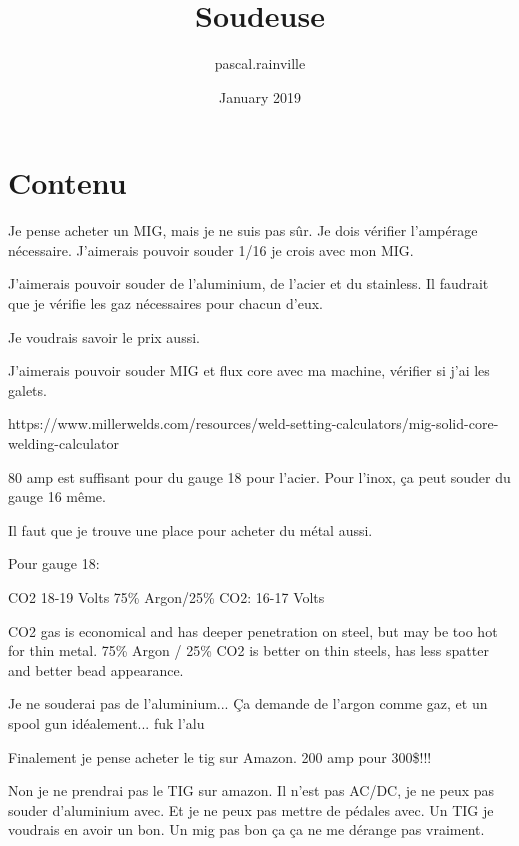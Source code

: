 \documentclass{article}
\title{Soudeuse}
\author{pascal.rainville }
\date{January 2019}
\begin{document}
\maketitle

\section{Contenu}

Je pense acheter un MIG, mais je ne suis pas sûr. Je dois vérifier l'ampérage nécessaire. J'aimerais pouvoir souder 1/16 je crois avec mon MIG.

J'aimerais pouvoir souder de l'aluminium, de l'acier et du stainless. Il faudrait que je vérifie les gaz nécessaires pour chacun d'eux.

Je voudrais savoir le prix aussi.

J'aimerais pouvoir souder MIG et flux core avec ma machine, vérifier si j'ai les galets.

https://www.millerwelds.com/resources/weld-setting-calculators/mig-solid-core-welding-calculator

80 amp est suffisant pour du gauge 18 pour l'acier.
Pour l'inox, ça peut souder du gauge 16 même.

Il faut que je trouve une place pour acheter du métal aussi.

Pour gauge 18:

CO2 18-19 Volts 75\% Argon/25\% CO2: 16-17 Volts

CO2 gas is economical and has deeper penetration on steel, but may be too hot for thin metal. 75\% Argon / 25\% CO2 is better on thin steels, has less spatter and better bead appearance.

Je ne souderai pas de l'aluminium... Ça demande de l'argon comme gaz, et un spool gun idéalement... fuk l'alu

Finalement je pense acheter le tig sur Amazon. 200 amp pour 300\$!!!


Non je ne prendrai pas le TIG sur amazon. Il n'est pas AC/DC, je ne peux pas souder d'aluminium avec. Et je ne peux pas mettre de pédales avec. Un TIG je voudrais en avoir un bon. Un mig pas bon ça ça ne me dérange pas vraiment.
\end{document}
